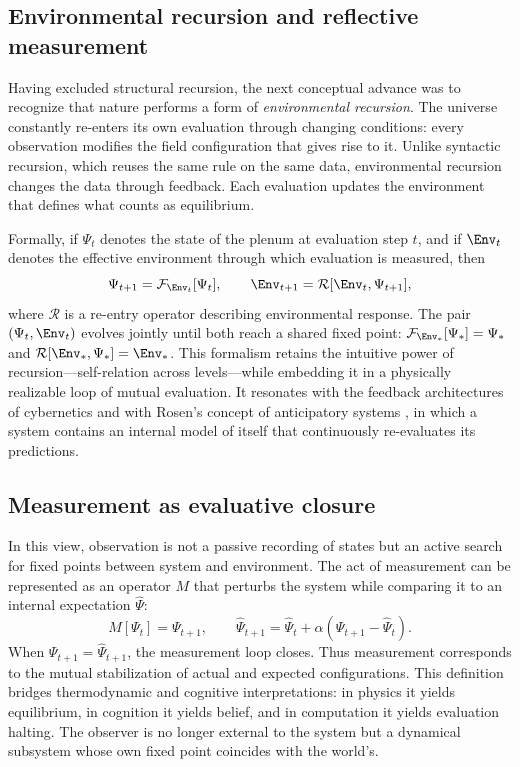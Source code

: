 \documentclass[12pt,a4paper]{article}
\newcommand{\State}{\Psi}             %
\newcommand{\F}{\mathcal{F}}          %
\theoremstyle{plain}
\begin{document}
\subsection{Environmental recursion and reflective measurement}
Having excluded structural recursion, the next conceptual advance was to recognize that nature performs a form of \emph{environmental recursion}.  The universe constantly re-enters its own evaluation through changing conditions: every observation modifies the field configuration that gives rise to it.  Unlike syntactic recursion, which reuses the same rule on the same data, environmental recursion changes the data through feedback.  Each evaluation updates the environment that defines what counts as equilibrium.

Formally, if $\State_t$ denotes the state of the plenum at evaluation step \(t\), and if $\Env_t$ denotes the effective environment through which evaluation is measured, then
\begin{equation}
\State_{t+1} = \F_{\Env_t}[\State_t],
\qquad
\Env_{t+1} = \mathcal{R}[\Env_t,\State_{t+1}],
\end{equation}
where $\mathcal{R}$ is a re-entry operator describing environmental response.
The pair $(\State_t,\Env_t)$ evolves jointly until both reach a shared fixed point:
\(\F_{\Env_*}[\State_*] = \State_*\) and \(\mathcal{R}[\Env_*,\State_*] = \Env_*\).
This formalism retains the intuitive power of recursion---self-relation across levels---while embedding it in a physically realizable loop of mutual evaluation.
It resonates with the feedback architectures of cybernetics \citep{bateson1972steps} and with Rosen’s concept of anticipatory systems \citep{rosen1985anticipatory}, in which a system contains an internal model of itself that continuously re-evaluates its predictions.

\subsection{Measurement as evaluative closure}
In this view, observation is not a passive recording of states but an active search for fixed points between system and environment.
The act of measurement can be represented as an operator \(M\) that perturbs the system while comparing it to an internal expectation \(\hat{\State}\):
\begin{equation}
M[\State_t] = \State_{t+1},
\qquad
\hat{\State}_{t+1} = \hat{\State}_t + \alpha(\State_{t+1}-\hat{\State}_t).
\end{equation}
When $\State_{t+1}=\hat{\State}_{t+1}$, the measurement loop closes.
Thus measurement corresponds to the mutual stabilization of actual and expected configurations.
This definition bridges thermodynamic and cognitive interpretations: in physics it yields equilibrium, in cognition it yields belief, and in computation it yields evaluation halting.
The observer is no longer external to the system but a dynamical subsystem whose own fixed point coincides with the world’s.
\end{document}
